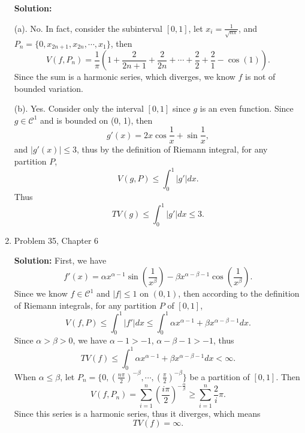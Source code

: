 \documentclass{article}%
\begin{document}
\begin{enumerate}
\smallskip
\textbf{Solution:}

(a). No. In fact, consider the subinterval $[0, 1]$, let $x_i = \frac{1}{\sqrt{n\pi}} $, and $P_n = \{0, x_{2n+1}, x_{2n},\cdots, x_1\} $, then
$$
V(f, P_n) = \frac{1}{\pi}(1+\frac{2}{2n+1}+\frac{2}{2n}+\cdots+\frac{2}{2}+\frac{2}{1}-\cos(1)).
$$
Since the sum is a harmonic series, which diverges, we know $f $ is not of bounded variation.

(b). Yes. Consider only the interval $[0, 1]$ since $g$ is an even function. Since $g\in\mathcal{C}^1 $ and is bounded on (0, 1), then 
$$
g'(x) = 2x\cos\frac{1}{x}+\sin\frac{1}{x},
$$
and $|g'(x)|\le 3 $, thus by the definition of Riemann integral, for any partition $P$,
$$
V(g, P) \le \int_{0}^{1}|g'|dx.
$$
Thus
$$
TV(g) \le\int_{0}^{1}|g'|dx \le 3.
$$
\bigskip
\item  Problem 35, Chapter 6

\smallskip
\textbf{Solution:}
First, we have
$$
f'(x) = \alpha x^{\alpha-1}\sin(\frac{1}{x^\beta})-\beta x^{\alpha-\beta-1}\cos(\frac{1}{x^\beta}).
$$
Since we know $f\in\mathcal{C}^1 $ and $|f|\le 1$ on $(0, 1)$, then according to the definition of Riemann integrals, for any partition $P$ of $[0, 1]$,
$$
V(f, P) \le\int_{0}^{1}|f'|dx \le \int_{0}^{1}\alpha x^{\alpha-1}+\beta x^{\alpha-\beta-1}dx.
$$
Since $\alpha > \beta > 0$, we have $\alpha-1 > -1$, $\alpha-\beta-1 > -1$, thus 
$$
TV(f) \le\int_{0}^{1}\alpha x^{\alpha-1}+\beta x^{\alpha-\beta-1}dx < \infty.
$$
When $\alpha \le \beta$, let $P_n = \{0, (\frac{n\pi}{2})^{-\beta}, \cdots, (\frac{\pi}{2})^{-\beta}\}$ be a partition of $[0, 1]$. Then
$$
V(f, P_n) = \sum_{i=1}^{n}(\frac{i\pi}{2})^{-\frac{\alpha}{\beta}} \ge \sum_{i=1}^{n}\frac{2}{i}\pi.
$$
Since this series is a harmonic series, thus it diverges, which means
$$
TV(f) = \infty.
$$
\end{enumerate}
\end{document}
